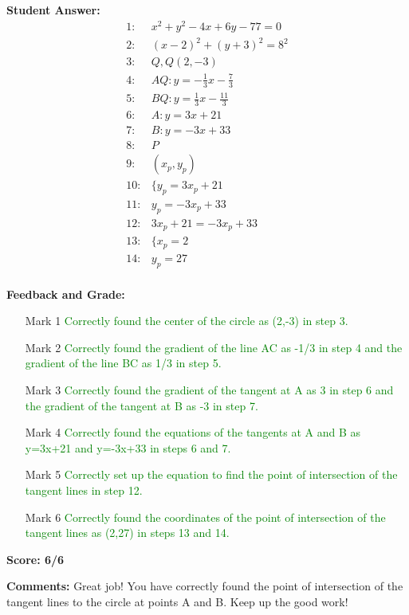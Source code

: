 \documentclass{article}
\begin{document}
\textbf{Student Answer:}
\begin{align*}
1: & x^2+y^2-4x+6y-77=0 \\
2: & (x-2)^2+(y+3)^2=8^2 \\
3: & Q,Q(2,-3) \\
4: & AQ:y=-\frac{1}{3}x-\frac{7}{3} \\
5: & BQ:y=\frac{1}{3}x-\frac{11}{3} \\
6: & A:y=3x+21 \\
7: & B:y=-3x+33 \\
8: & P \\
9: & (x_p,y_p) \\
10: & \{y_p=3x_p+21 \\
11: & y_p=-3x_p+33 \\
12: & 3x_p+21=-3x_p+33 \\
13: & \{x_p=2 \\
14: & y_p=27 \\
\end{align*}

\textbf{Feedback and Grade:}
\begin{itemize}
\item[Mark 1] \textcolor{green}{Correctly found the center of the circle as (2,-3) in step 3.}
\item[Mark 2] \textcolor{green}{Correctly found the gradient of the line AC as -1/3 in step 4 and the gradient of the line BC as 1/3 in step 5.}
\item[Mark 3] \textcolor{green}{Correctly found the gradient of the tangent at A as 3 in step 6 and the gradient of the tangent at B as -3 in step 7.}
\item[Mark 4] \textcolor{green}{Correctly found the equations of the tangents at A and B as y=3x+21 and y=-3x+33 in steps 6 and 7.}
\item[Mark 5] \textcolor{green}{Correctly set up the equation to find the point of intersection of the tangent lines in step 12.}
\item[Mark 6] \textcolor{green}{Correctly found the coordinates of the point of intersection of the tangent lines as (2,27) in steps 13 and 14.}
\end{itemize}

\textbf{Score: 6/6}

\textbf{Comments:} Great job! You have correctly found the point of intersection of the tangent lines to the circle at points A and B. Keep up the good work!
\end{document}
